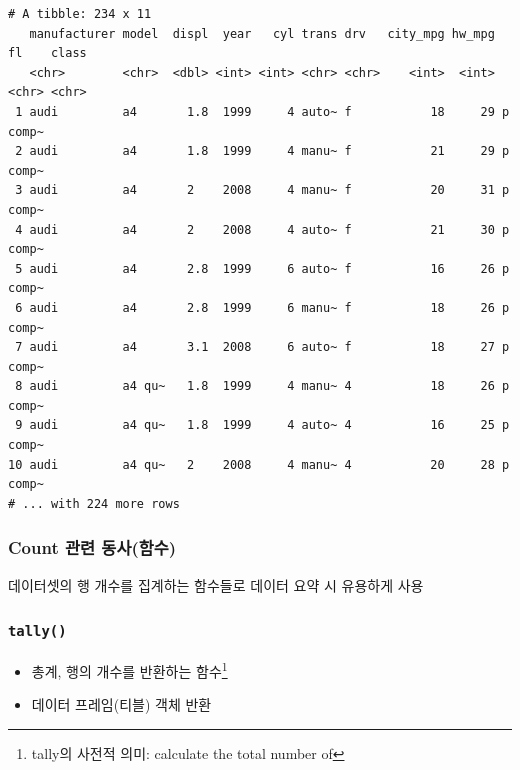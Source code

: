 \documentclass[
  11pt,
]{krantz}
\makeatletter
\newenvironment{Shaded}{\begin{snugshade}}{\end{snugshade}}
\newcommand{\CommentTok}[1]{\textcolor[rgb]{0.37,0.37,0.37}{\textit{#1}}}
\newcommand{\NormalTok}[1]{#1}
\newcommand{\OperatorTok}[1]{\textcolor[rgb]{0.43,0.43,0.43}{\textbf{#1}}}
\newcommand{\StringTok}[1]{\textcolor[rgb]{0.5,0.5,0.5}{#1}}
\providecommand{\tightlist}{%
  \setlength{\itemsep}{0pt}\setlength{\parskip}{0pt}}
\newenvironment{kframe}{%
\medskip{}
\setlength{\fboxsep}{.8em}
 \def\at@end@of@kframe{}%
 \ifinner\ifhmode%
  \def\at@end@of@kframe{\end{minipage}}%
  \begin{minipage}{\columnwidth}%
 \fi\fi%
 \def\FrameCommand##1{\hskip\@totalleftmargin \hskip-\fboxsep
 \colorbox{shadecolor}{##1}\hskip-\fboxsep
     \hskip-\linewidth \hskip-\@totalleftmargin \hskip\columnwidth}%
 \MakeFramed {\advance\hsize-\width
   \@totalleftmargin\z@ \linewidth\hsize
   \@setminipage}}%
 {\par\unskip\endMakeFramed%
 \at@end@of@kframe}
\renewenvironment{quote}{\begin{kframe}}{\end{kframe}}
\makeatother
\begin{document}
\begin{verbatim}
# A tibble: 234 x 11
   manufacturer model  displ  year   cyl trans drv   city_mpg hw_mpg fl    class
   <chr>        <chr>  <dbl> <int> <int> <chr> <chr>    <int>  <int> <chr> <chr>
 1 audi         a4       1.8  1999     4 auto~ f           18     29 p     comp~
 2 audi         a4       1.8  1999     4 manu~ f           21     29 p     comp~
 3 audi         a4       2    2008     4 manu~ f           20     31 p     comp~
 4 audi         a4       2    2008     4 auto~ f           21     30 p     comp~
 5 audi         a4       2.8  1999     6 auto~ f           16     26 p     comp~
 6 audi         a4       2.8  1999     6 manu~ f           18     26 p     comp~
 7 audi         a4       3.1  2008     6 auto~ f           18     27 p     comp~
 8 audi         a4 qu~   1.8  1999     4 manu~ 4           18     26 p     comp~
 9 audi         a4 qu~   1.8  1999     4 auto~ 4           16     25 p     comp~
10 audi         a4 qu~   2    2008     4 manu~ 4           20     28 p     comp~
# ... with 224 more rows
\end{verbatim}

\normalsize

\hypertarget{dplyr-count}{%
\subsubsection*{\texorpdfstring{\textbf{Count 관련 동사(함수)}}{Count 관련 동사(함수)}}\label{dplyr-count}}


\begin{quote}
데이터셋의 행 개수를 집계하는 함수들로 데이터 요약 시 유용하게 사용
\end{quote}

\hypertarget{tally}{%
\subsubsection*{\texorpdfstring{\texttt{tally()}}{tally()}}\label{tally}}


\begin{itemize}
\tightlist
\item
  총계, 행의 개수를 반환하는 함수\footnote{tally의 사전적 의미: calculate the total number of}
\item
  데이터 프레임(티블) 객체 반환
\end{itemize}

\footnotesize

\begin{Shaded}
\end{Shaded}
\end{document}
